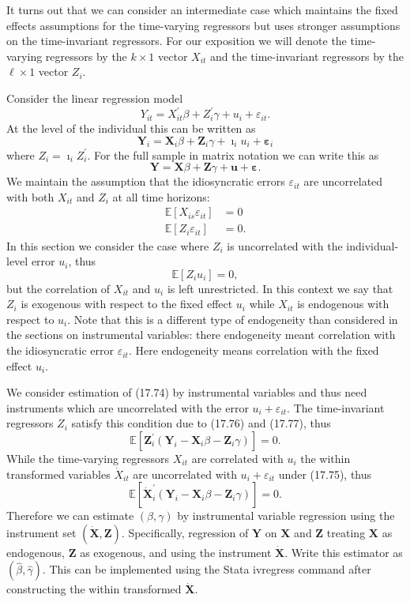 \documentclass[10pt]{article}
\begin{document}
It turns out that we can consider an intermediate case which maintains the fixed effects assumptions for the time-varying regressors but uses stronger assumptions on the time-invariant regressors. For our exposition we will denote the time-varying regressors by the $k \times 1$ vector $X_{i t}$ and the time-invariant regressors by the $\ell \times 1$ vector $Z_{i}$.

Consider the linear regression model
$$
Y_{i t}=X_{i t}^{\prime} \beta+Z_{i}^{\prime} \gamma+u_{i}+\varepsilon_{i t} .
$$
At the level of the individual this can be written as
$$
\boldsymbol{Y}_{i}=\boldsymbol{X}_{i} \beta+\boldsymbol{Z}_{i} \gamma+\boldsymbol{\imath}_{i} u_{i}+\boldsymbol{\varepsilon}_{i}
$$
where $Z_{i}=\boldsymbol{\imath}_{i} Z_{i}^{\prime}$. For the full sample in matrix notation we can write this as
$$
\boldsymbol{Y}=\boldsymbol{X} \beta+\boldsymbol{Z} \gamma+\boldsymbol{u}+\boldsymbol{\varepsilon} .
$$
We maintain the assumption that the idiosyncratic errors $\varepsilon_{i t}$ are uncorrelated with both $X_{i t}$ and $Z_{i}$ at all time horizons:
$$
\begin{aligned}
\mathbb{E}\left[X_{i s} \varepsilon_{i t}\right] &=0 \\
\mathbb{E}\left[Z_{i} \varepsilon_{i t}\right] &=0 .
\end{aligned}
$$
In this section we consider the case where $Z_{i}$ is uncorrelated with the individual-level error $u_{i}$, thus
$$
\mathbb{E}\left[Z_{i} u_{i}\right]=0,
$$
but the correlation of $X_{i t}$ and $u_{i}$ is left unrestricted. In this context we say that $Z_{i}$ is exogenous with respect to the fixed effect $u_{i}$ while $X_{i t}$ is endogenous with respect to $u_{i}$. Note that this is a different type of endogeneity than considered in the sections on instrumental variables: there endogeneity meant correlation with the idiosyncratic error $\varepsilon_{i t}$. Here endogeneity means correlation with the fixed effect $u_{i}$.

We consider estimation of (17.74) by instrumental variables and thus need instruments which are uncorrelated with the error $u_{i}+\varepsilon_{i t}$. The time-invariant regressors $Z_{i}$ satisfy this condition due to (17.76) and (17.77), thus
$$
\mathbb{E}\left[\boldsymbol{Z}_{i}^{\prime}\left(\boldsymbol{Y}_{i}-\boldsymbol{X}_{i} \beta-\boldsymbol{Z}_{i} \gamma\right)\right]=0 .
$$
While the time-varying regressors $X_{i t}$ are correlated with $u_{i}$ the within transformed variables $\dot{X}_{i t}$ are uncorrelated with $u_{i}+\varepsilon_{i t}$ under (17.75), thus
$$
\mathbb{E}\left[\dot{\boldsymbol{X}}_{i}^{\prime}\left(\boldsymbol{Y}_{i}-\boldsymbol{X}_{i} \beta-\boldsymbol{Z}_{i} \gamma\right)\right]=0 .
$$
Therefore we can estimate $(\beta, \gamma)$ by instrumental variable regression using the instrument set $(\dot{\boldsymbol{X}}, \boldsymbol{Z})$. Specifically, regression of $\boldsymbol{Y}$ on $\boldsymbol{X}$ and $\boldsymbol{Z}$ treating $\boldsymbol{X}$ as endogenous, $\boldsymbol{Z}$ as exogenous, and using the instrument $\dot{\boldsymbol{X}}$. Write this estimator as $(\widehat{\beta}, \widehat{\gamma})$. This can be implemented using the Stata ivregress command after constructing the within transformed $\dot{\boldsymbol{X}}$.
\end{document}
